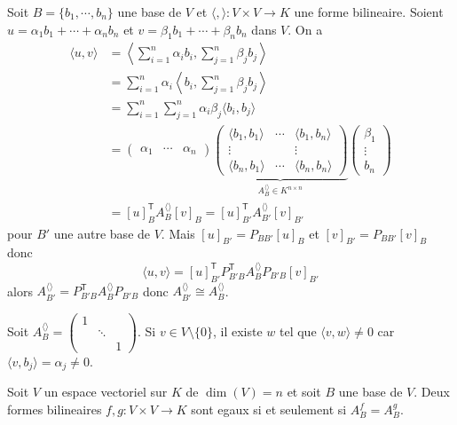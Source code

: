 Soit $B=\{ b_{1},\cdots,b_{n} \}$ une base de $V$ et $\langle , \rangle:V\times V\to K$ une forme bilineaire. Soient $u=\alpha_{1}b_{1}+\cdots +\alpha _{n}b_{n}$ et $v=\beta_{1}b_{1}+\cdots +\beta _{n}b_{n}$ dans $V$. On a
\begin{align*}
\langle u,v \rangle  & =\left\langle  \sum_{i=1}^{n} \alpha _{i}b_{i},\sum_{j=1}^{n} \beta _{j}b_{j}  \right\rangle   \\
 & =\sum_{i=1}^{n} \alpha _{i}\left\langle  b_{i},\sum_{j=1}^{n} \beta _{j}b_{j}  \right\rangle   \\
 & =\sum_{i=1}^{n} \sum_{j=1}^{n} \alpha _{i}\beta _{j}\langle b_{i},b_{j} \rangle  \\
 & =\begin{pmatrix}
\alpha_{1} & \cdots & \alpha _{n} 
\end{pmatrix}\underbrace{ \begin{pmatrix}
\langle b_{1},b_{1} \rangle  &  \cdots & \langle b_{1},b_{n} \rangle \\
\vdots  &   & \vdots \\
\langle b_{n},b_{1} \rangle  & \cdots  & \langle b_{n},b_{n} \rangle  
\end{pmatrix} }_{ A_{B}^{\langle  \rangle }\in K^{n\times n} }\begin{pmatrix}
\beta_{1} \\
\vdots  \\
b_{n}
\end{pmatrix} \\
 & =[u]_{B }^{\mathsf{T}}A_{B}^{\langle  \rangle}[v]_{B}=[u]_{B'}^{\mathsf{T}}A_{B'}^{\langle  \rangle }[v]_{B'}
\end{align*}
pour $B'$ une autre base de $V$. Mais $[u]_{B'}=P_{BB'}[u]_{B}$ et $[v]_{B'}=P_{BB'}[v]_{B}$ donc
$$
\langle u,v \rangle=[u]^{\mathsf{T}}_{B'}P^{\mathsf{T}}_{B'B}A_{B}^{\langle  \rangle }P_{B'B}[v]_{B'}
$$
alors $A_{B'}^{\langle  \rangle}=P_{B'B}^{\mathsf{T}}A_{B}^{\langle  \rangle}P_{B'B}$ donc $A_{B'}^{\langle  \rangle}\cong A_{B}^{\langle  \rangle}$. 
\begin{example}
Soit $A_{B}^{\langle  \rangle}=\begin{pmatrix}1 &  &  \\  & \ddots &  \\  &  & 1\end{pmatrix}$. Si $v\in V\setminus \{ 0 \}$, il existe $w$ tel que $\langle v,w \rangle\neq 0$ car $\langle v,b_{j} \rangle=\alpha _{j}\neq0$.
\end{example}

\begin{exercise}
Soit $V$ un espace vectoriel sur $K$ de $\dim(V)=n$ et soit $B$ une base de $V$. Deux formes bilineaires $f,g:V\times V\to K$ sont egaux si et seulement si $A_{B}^{f}=A^{g}_{B}$.
\end{exercise}

